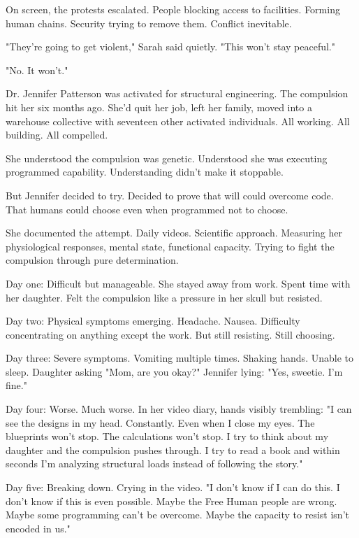 On screen, the protests escalated. People blocking access to facilities. Forming human chains. Security trying to remove them. Conflict inevitable.

"They're going to get violent," Sarah said quietly. "This won't stay peaceful."

"No. It won't."

\scenebreak

Dr. Jennifer Patterson was activated for structural engineering. The compulsion hit her six months ago. She'd quit her job, left her family, moved into a warehouse collective with seventeen other activated individuals. All working. All building. All compelled.

She understood the compulsion was genetic. Understood she was executing programmed capability. Understanding didn't make it stoppable.

But Jennifer decided to try. Decided to prove that will could overcome code. That humans could choose even when programmed not to choose.

She documented the attempt. Daily videos. Scientific approach. Measuring her physiological responses, mental state, functional capacity. Trying to fight the compulsion through pure determination.

Day one: Difficult but manageable. She stayed away from work. Spent time with her daughter. Felt the compulsion like a pressure in her skull but resisted.

Day two: Physical symptoms emerging. Headache. Nausea. Difficulty concentrating on anything except the work. But still resisting. Still choosing.

Day three: Severe symptoms. Vomiting multiple times. Shaking hands. Unable to sleep. Daughter asking "Mom, are you okay?" Jennifer lying: "Yes, sweetie. I'm fine."

Day four: Worse. Much worse. In her video diary, hands visibly trembling: "I can see the designs in my head. Constantly. Even when I close my eyes. The blueprints won't stop. The calculations won't stop. I try to think about my daughter and the compulsion pushes through. I try to read a book and within seconds I'm analyzing structural loads instead of following the story."

Day five: Breaking down. Crying in the video. "I don't know if I can do this. I don't know if this is even possible. Maybe the Free Human people are wrong. Maybe some programming can't be overcome. Maybe the capacity to resist isn't encoded in us."

